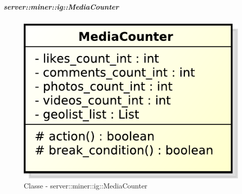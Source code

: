 	\subparagraph{server::miner::ig::MediaCounter} %
		\label{subp:server_miner_ig_MediaCounter}
		    \begin{figure}[!htbp]
 		 		\centering
 				\centerline{\includegraphics[scale=0.75]{./images/server/classes/miner/media_counter.pdf}}
 				\caption{Classe - server::miner::ig::MediaCounter}
			\end{figure}
